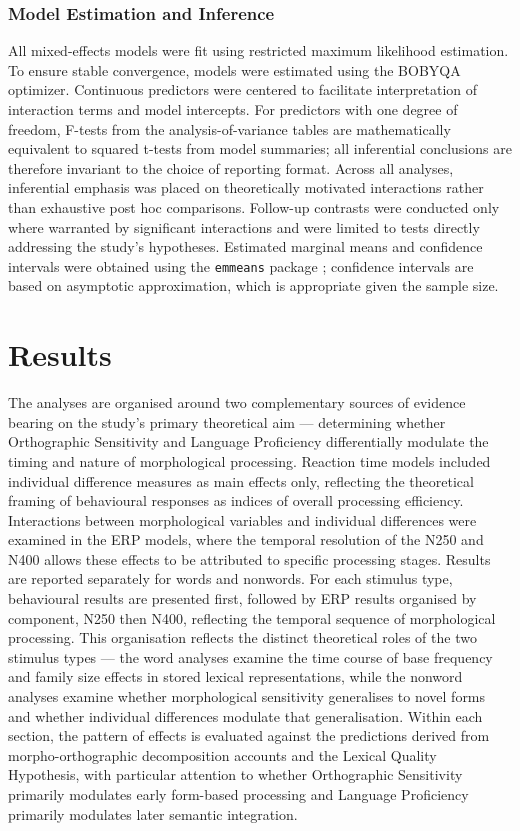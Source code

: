 \documentclass[utf8]{FrontiersinHarvard} %
\begin{document}
	\subsubsection{Model Estimation and Inference}
	All mixed-effects models were fit using restricted maximum likelihood estimation. To ensure stable convergence, models were estimated using the BOBYQA optimizer. Continuous predictors were centered to facilitate interpretation of interaction terms and model intercepts. For predictors with one degree of freedom, F-tests from the analysis-of-variance tables are mathematically equivalent to squared t-tests from model summaries; all inferential conclusions are therefore invariant to the choice of reporting format. Across all analyses, inferential emphasis was placed on theoretically motivated interactions rather than exhaustive post hoc comparisons. Follow-up contrasts were conducted only where warranted by significant interactions and were limited to tests directly addressing the study’s hypotheses. Estimated marginal means and confidence intervals were obtained using the \texttt{emmeans} package \citep{lenthEmmeansEstimatedMarginal2026}; confidence intervals are based on asymptotic approximation, which is appropriate given the sample size.
	
	\section{Results}
	
	The analyses are organised around two complementary sources of evidence bearing on the study's primary theoretical aim --- determining whether Orthographic Sensitivity and Language Proficiency differentially modulate the timing and nature of morphological processing. Reaction time models included individual difference measures as main effects only, reflecting the theoretical framing of behavioural responses as indices of overall processing efficiency. Interactions between morphological variables and individual differences were examined in the ERP models, where the temporal resolution of the N250 and N400 allows these effects to be attributed to specific processing stages. Results are reported separately for words and nonwords. For each stimulus type, behavioural results are presented first, followed by ERP results organised by component, N250 then N400, reflecting the temporal sequence of morphological processing. This organisation reflects the distinct theoretical roles of the two stimulus types --- the word analyses examine the time course of base frequency and family size effects in stored lexical representations, while the nonword analyses examine whether morphological sensitivity generalises to novel forms and whether individual differences modulate that generalisation. Within each section, the pattern of effects is evaluated against the predictions derived from morpho-orthographic decomposition accounts and the Lexical Quality Hypothesis, with particular attention to whether Orthographic Sensitivity primarily modulates early form-based processing and Language Proficiency primarily modulates later semantic integration.
	
\end{document}

